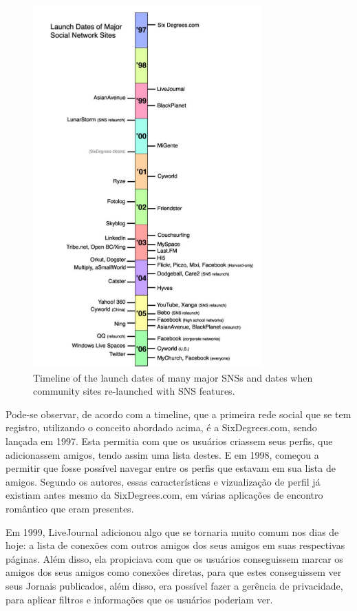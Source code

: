 \begin{figure}[h]
    \centering
    \includegraphics[width=330px, scale=1]{figuras/historicosns}
    \caption{Timeline of the launch dates of many major SNSs and dates when community sites
re-launched with SNS features. }
    \label{fig:historicosns}
\end{figure}

Pode-se observar, de acordo com a timeline, que a primeira rede social que se tem
registro, utilizando o conceito abordado acima, é a SixDegrees.com, sendo lançada
em 1997. Esta permitia com que os usuários criassem seus perfis, que adicionassem
amigos, tendo assim uma lista destes. E em 1998, começou a permitir que fosse possível
navegar entre os perfis que estavam em sua lista de amigos. Segundo os autores,
essas características e vizualização de perfil já existiam antes mesmo da SixDegrees.com,
em várias aplicações de encontro romântico que eram presentes.

Em 1999, LiveJournal adicionou algo que se tornaria muito comum nos dias de hoje:
a lista de conexões com outros amigos dos seus amigos em suas respectivas páginas.
Além disso, ela propiciava com que os usuários conseguissem marcar os amigos
dos seus amigos como conexões diretas, para que estes conseguissem ver seus Jornais
publicados, além disso, era possível fazer a gerência de privacidade, para
aplicar filtros e informações que os usuários poderiam ver.

